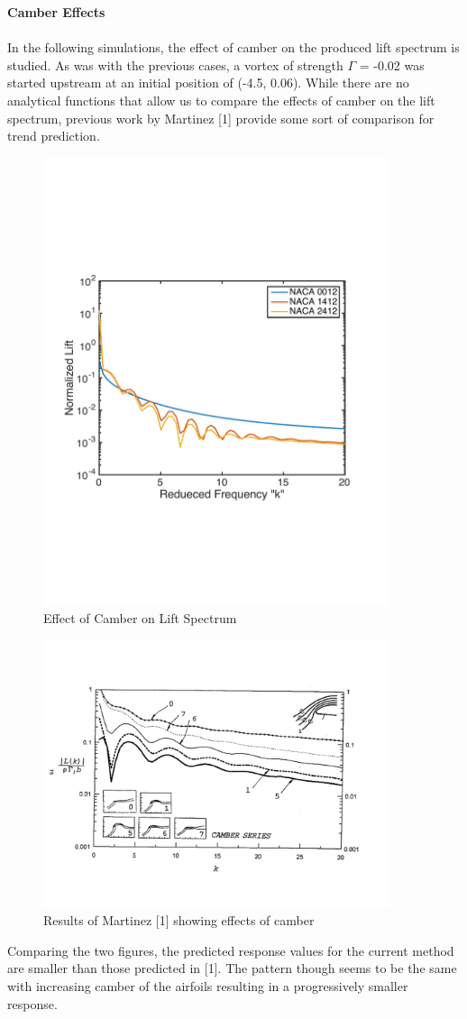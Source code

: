\documentclass{article}
\begin{document}
\noindent \textbf{Camber Effects} \\ \\
In the following simulations, the effect of camber on the produced lift spectrum is studied. As was with the previous cases, a vortex of strength $\Gamma$ = -0.02 was started upstream at an initial position of (-4.5, 0.06). While there are no analytical functions that allow us to compare the effects of camber on the lift spectrum, previous work by Martinez [1] provide some sort of comparison for trend prediction. 

\begin{figure}[h]
\includegraphics[width = 4in, height = 3 in]{Camber_Compare}
\centering
\caption{Effect of Camber on Lift Spectrum}
\end{figure}

\begin{figure}[h]
\includegraphics[width = 4in, height = 2.5 in]{Martinez_Camber}
\centering
\caption{Results of Martinez [1] showing effects of camber}
\end{figure}

\noindent Comparing the two figures, the predicted response values for the current method are smaller than those predicted in [1]. The pattern though seems to be the same with increasing camber of the airfoils resulting in a progressively smaller response. \\
\end{document}
